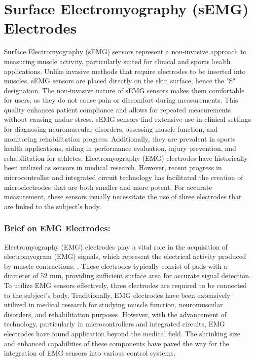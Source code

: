 \documentclass[ 12pt,a4paper,twocolumn,fleqn]{report}
\begin{document}
\section{Surface Electromyography (sEMG) Electrodes}
\vspace{2mm}
Surface Electromyography (sEMG) sensors represent a non-invasive approach to measuring muscle activity, particularly suited for clinical and sports health applications. Unlike invasive methods that require electrodes to be inserted into muscles, sEMG sensors are placed directly on the skin surface, hence the "S" designation.\vskip 6pt
The non-invasive nature of sEMG sensors makes them comfortable for users, as they do not cause pain or discomfort during measurements. This quality enhances patient compliance and allows for repeated measurements without causing undue stress.\vskip 6pt
sEMG sensors find extensive use in clinical settings for diagnosing neuromuscular disorders, assessing muscle function, and monitoring rehabilitation progress. Additionally, they are prevalent in sports health applications, aiding in performance evaluation, injury prevention, and rehabilitation for athletes.\vskip 6pt
Electromyography (EMG) electrodes have historically been utilized as sensors in medical research. However, recent progress in microcontroller and integrated circuit technology has facilitated the creation of microelectrodes that are both smaller and more potent. For accurate measurement, these sensors usually necessitate the use of three electrodes that are linked to the subject's body.\vskip 6pt


\subsubsection{Brief on EMG Electrodes:} \vskip 6pt
Electromyography (EMG) electrodes play a vital role in the acquisition of electromyogram (EMG) signals, which represent the electrical activity produced by muscle contractions.
. These electrodes typically consist of pads with a diameter of 52 mm, providing sufficient surface area for accurate signal detection. To utilize EMG sensors effectively, three electrodes are required to be connected to the subject's body.\vskip 6pt
Traditionally, EMG electrodes have been extensively utilized in medical research for studying muscle function, neuromuscular disorders, and rehabilitation purposes. However, with the advancement of technology, particularly in microcontrollers and integrated circuits, EMG electrodes have found application beyond the medical field. The shrinking size and enhanced capabilities of these components have paved the way for the integration of EMG sensors into various control systems.
\newpage
  \pagestyle{fancy}
\thisfancypage{%
  \setlength{\fboxsep}{20pt}\doublebox}{}
\normalsize
\end{document}
